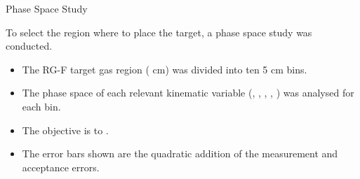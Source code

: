 \begin{frame}{Phase Space Study}
    \label{12.11::summary}

    To select the region where to place the target, a phase space study was conducted.

    \vspace{12pt}
    \begin{itemize}
        \item
            The RG-F target gas region ( \textcolor{efd_green}{cm}) was divided into ten 5 cm bins.

        \vspace{6pt}
        \item
            The phase space of each relevant kinematic variable (, \ef{$\nu$}, , , ) was analysed for each bin.

        \vspace{6pt}
        \item
            The objective is to .

        \vspace{6pt}
        \item
            The error bars shown are the quadratic addition of the measurement and acceptance errors.
    \end{itemize}
\end{frame}

